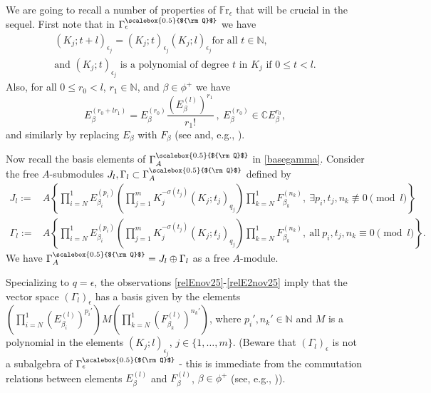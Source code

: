\documentclass[11pt]{amsart}
\newcommand{\e}{\epsilon}
\newcommand{\mc}{\mathbb{C}}
\newcommand{\mn}{\mathbb{N}}
\newcommand{\Q}{{\scalebox{0.5}{${\rm Q}$}}}
\begin{document}
We are going to recall a number of properties of $\mathbb{F}\mathrm{r}_\e$ that will be crucial in the sequel. First note that in $\Gamma_\e^\Q$ we have 
\begin{equation}\label{relEnov25}
\begin{array}{c} (K_j; t+l)_{\e_j} = (K_j; t)_{\e_j}(K_j; l)_{\e_j} \text{for all } t\in \mn,\\[.3em]
\text{and } (K_j; t)_{\e_j} \text{ is a  polynomial of degree } t \text{ in } K_j \text{ if } 0\leq t<l.
\end{array}
\end{equation}
Also, for all $0\leq r_0<l$, $r_1\in \mn$, and $\beta\in \phi^+$ we have
\begin{equation}\label{relE2nov25}
E_\beta^{(r_0+lr_1)} = E_\beta^{(r_0)}\frac{(E_\beta^{(l)})^{r_1}}{r_1!}\ ,\ E_\beta^{(r_0)}\in \mc E_\beta^{r_0},
\end{equation}
and similarly by replacing $E_\beta$ with $F_\beta$ (see \cite{Lusztig0} and, e.g., \cite[Rk. 1 on page 300, and top of page 302]{CP}).

Now recall the basis elements of $\Gamma_A^\Q$ in \eqref{basegamma}. Consider the free $A$-submodules $J_l,\Gamma_l\subset \Gamma_A^\Q$ defined by
\begin{align} J_l := & A\left\lbrace\prod_{i=N}^1 E_{\beta_i}^{(p_i)}\left(\prod_{j=1}^m K_j^{-\sigma(t_j)}(K_j; t_j)_{q_j} \right)\prod_{k=N}^1 F_{\beta_k}^{(n_k)},\ \exists p_i,t_j,n_k \not\equiv 0 \!\!\pmod{l}\right\rbrace \label{Jldef}\\ \Gamma_l := & A\left\lbrace\prod_{i=N}^1 E_{\beta_i}^{(p_i)}\left(\prod_{j=1}^m K_j^{-\sigma(t_j)}(K_j; t_j)_{q_j} \right)\prod_{k=N}^1 F_{\beta_k}^{(n_k)},\ \mathrm{all}\ p_i,t_j,n_k \equiv 0 \!\!\pmod{l}\right\rbrace.\label{Gammaldef}\end{align}
We have $\Gamma_A^\Q = J_l \oplus \Gamma_l$ as a free $A$-module.

Specializing to $q=\e$, the observations \eqref{relEnov25}-\eqref{relE2nov25} imply that the vector space $(\Gamma_l)_\e$ has a basis given by the elements $\textstyle (\prod_{i=N}^1 (E_{\beta_i}^{(l)})^{p_i'})M(\prod_{k=N}^1 (F_{\beta_k}^{(l)})^{n_k'})$, where $p_i',n_k'\in \mn$ and $M$ is a polynomial in the elements $(K_j; l)_{\e_j}$, $j\in \{1,\ldots,m\}$. (Beware that $(\Gamma_l)_\e$ is not a subalgebra of $\Gamma_\e^\Q$ - this is immediate from the commutation relations between elements $E_{\beta}^{(l)}$ and $F_{\beta}^{(l)}$, $\beta\in \phi^+$ (see, e.g., \cite[Prop.\,3.23]{VY})).
\end{document}
